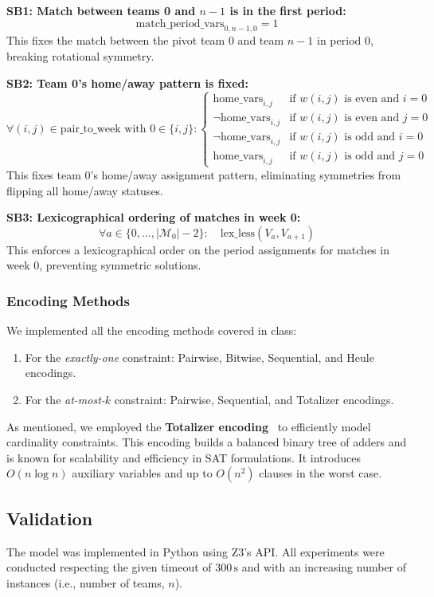 \textbf{SB1: Match between teams 0 and $n-1$ is in the first period:}
\[
\text{match\_period\_vars}_{0,n-1,0} = 1
\]
This fixes the match between the pivot team 0 and team $n-1$ in period 0, breaking rotational symmetry.

\textbf{SB2: Team 0's home/away pattern is fixed:}
\[
\forall (i,j) \in \text{pair\_to\_week} \text{ with } 0 \in \{i,j\}:
\begin{cases}
\text{home\_vars}_{i,j} & \text{if } w(i,j) \text{ is even and } i=0 \\
\neg \text{home\_vars}_{i,j} & \text{if } w(i,j) \text{ is even and } j=0 \\
\neg \text{home\_vars}_{i,j} & \text{if } w(i,j) \text{ is odd and } i=0 \\
\text{home\_vars}_{i,j} & \text{if } w(i,j) \text{ is odd and } j=0
\end{cases}
\]
This fixes team 0's home/away assignment pattern, eliminating symmetries from flipping all home/away statuses.

\textbf{SB3: Lexicographical ordering of matches in week 0:}
\[
\forall a \in \{0, \dots, |\mathcal{M}_0| - 2\}: \quad \text{lex\_less}(V_a, V_{a+1})
\]
This enforces a lexicographical order on the period assignments for matches in week 0, preventing symmetric solutions.

\subsubsection*{Encoding Methods}
We implemented all the encoding methods covered in class:

\begin{enumerate}
    \item For the \textit{exactly-one} constraint: Pairwise, Bitwise, Sequential, and Heule encodings.
    \item For the \textit{at-most-$k$} constraint: Pairwise, Sequential, and Totalizer encodings.
\end{enumerate}

As mentioned, we employed the \textbf{Totalizer encoding}~\cite{bailleux2003} to efficiently model cardinality constraints. This encoding builds a balanced binary tree of adders and is known for scalability and efficiency in SAT formulations. It introduces $O(n \log n)$ auxiliary variables and up to $O(n^2)$ clauses in the worst case.

\subsection{Validation}
The model was implemented in Python using Z3's API. All experiments were conducted respecting the given timeout of $300\,\mathrm{s}$ and with an increasing number of instances (i.e., number of teams, $n$).

